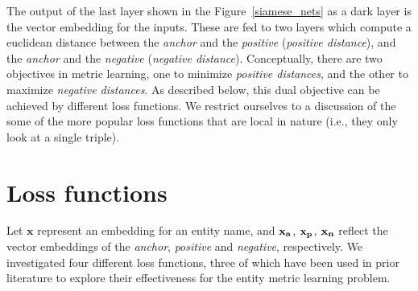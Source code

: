 



The output of the last layer shown in the Figure~\ref{siamese_nets} as a dark layer is the vector embedding for the inputs.  These are fed to two layers which compute a euclidean distance between the \textit{anchor} and the \textit{positive} (\textit{positive distance}), and the \textit{anchor} and the \textit{negative} (\textit{negative distance}).  Conceptually, there are two objectives in metric learning, one to minimize \textit{positive distances}, and the other to maximize \textit{negative distances}.  As described below, this dual objective can be achieved by different loss functions.  We restrict ourselves to a discussion of the some of the more popular loss functions that are local in nature (i.e., they only look at a single triple).  

\section{Loss functions}
\label{loss_functions}

Let $\mathbf{x}$ represent an embedding for an entity name, and $\bf{x_{a}}$, $\bf{x_{p}}$, $\bf{x_{n}}$ reflect the vector embeddings of the \textit{anchor}, \textit{positive} and \textit{negative}, respectively.  We investigated four different loss functions, three of which have been used in prior literature to explore their effectiveness for the entity metric learning problem.

